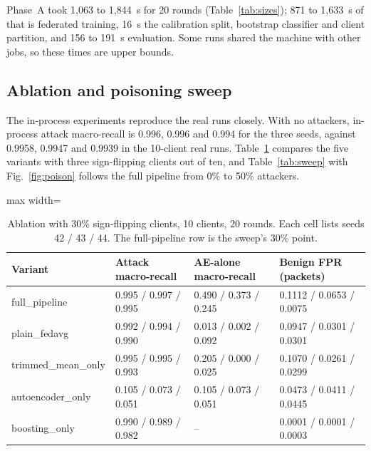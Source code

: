 Phase~A took 1,063 to 1,844~s for 20 rounds (Table~\ref{tab:sizes}); 871 to 1,633~s of that is federated training, 16~s the calibration split, bootstrap classifier and client partition, and 156 to 191~s evaluation. Some runs shared the machine with other jobs, so these times are upper bounds.

\subsection{Ablation and poisoning sweep}
The in-process experiments reproduce the real runs closely. With no attackers, in-process attack macro-recall is 0.996, 0.996 and 0.994 for the three seeds, against 0.9958, 0.9947 and 0.9939 in the 10-client real runs. Table~\ref{tab:ablation} compares the five variants with three sign-flipping clients out of ten, and Table~\ref{tab:sweep} with Fig.~\ref{fig:poison} follows the full pipeline from 0\% to 50\% attackers.

\begin{table}[t]
\centering
\caption{Ablation with 30\% sign-flipping clients, 10 clients, 20 rounds. Each cell lists seeds 42 / 43 / 44. The full-pipeline row is the sweep's 30\% point.}
\label{tab:ablation}
\small
\begin{adjustbox}{max width=\linewidth}
\begin{tabular}{llll}
\toprule
Variant & Attack macro-recall & AE-alone macro-recall & Benign FPR (packets) \\
\midrule
full\_pipeline & 0.995 / 0.997 / 0.995 & 0.490 / 0.373 / 0.245 & 0.1112 / 0.0653 / 0.0075 \\
plain\_fedavg & 0.992 / 0.994 / 0.990 & 0.013 / 0.002 / 0.092 & 0.0947 / 0.0301 / 0.0301 \\
trimmed\_mean\_only & 0.995 / 0.995 / 0.993 & 0.205 / 0.000 / 0.025 & 0.1070 / 0.0261 / 0.0299 \\
autoencoder\_only & 0.105 / 0.073 / 0.051 & 0.105 / 0.073 / 0.051 & 0.0473 / 0.0411 / 0.0445 \\
boosting\_only & 0.990 / 0.989 / 0.982 & -- & 0.0001 / 0.0001 / 0.0003 \\
\bottomrule
\end{tabular}
\end{adjustbox}
\end{table}

